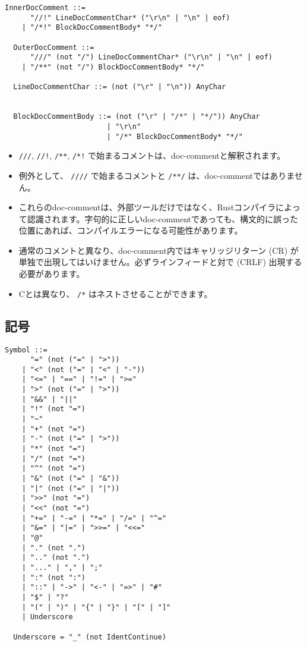 \documentclass[dvipdfmx,uplatex,papersize,a4paper,10pt]{jsbook}
\theoremstyle{definition}
\begin{document}
\begin{lstlisting}[gobble=2]
  InnerDocComment ::=
      "//!" LineDocCommentChar* ("\r\n" | "\n" | eof)
    | "/*!" BlockDocCommentBody* "*/"

  OuterDocComment ::=
      "///" (not "/") LineDocCommentChar* ("\r\n" | "\n" | eof)
    | "/**" (not "/") BlockDocCommentBody* "*/"

  LineDocCommentChar ::= (not ("\r" | "\n")) AnyChar


  BlockDocCommentBody ::= (not ("\r" | "/*" | "*/")) AnyChar
                        | "\r\n"
                        | "/*" BlockDocCommentBody* "*/"
\end{lstlisting}

\begin{itemize}
  \item \verb|///|, \verb|//!|, \verb|/**|, \verb|/*!| で始まるコメントは、doc-commentと解釈されます。
  \item 例外として、 \verb|////| で始まるコメントと \verb|/**/| は、doc-commentではありません。
  \item これらのdoc-commentは、外部ツールだけではなく、Rustコンパイラによって認識されます。字句的に正しいdoc-commentであっても、構文的に誤った位置にあれば、コンパイルエラーになる可能性があります。
  \item 通常のコメントと異なり、doc-comment内ではキャリッジリターン (CR) が単独で出現してはいけません。必ずラインフィードと対で (CRLF) 出現する必要があります。
  \item Cとは異なり、 \verb|/*| はネストさせることができます。
\end{itemize}

\subsection{記号}

\begin{lstlisting}[gobble=2]
  Symbol ::=
      "=" (not ("=" | ">"))
    | "<" (not ("=" | "<" | "-"))
    | "<=" | "==" | "!=" | ">="
    | ">" (not ("=" | ">"))
    | "&&" | "||"
    | "!" (not "=")
    | "~"
    | "+" (not "=")
    | "-" (not ("=" | ">"))
    | "*" (not "=")
    | "/" (not "=")
    | "^" (not "=")
    | "&" (not ("=" | "&"))
    | "|" (not ("=" | "|"))
    | ">>" (not "=")
    | "<<" (not "=")
    | "+=" | "-=" | "*=" | "/=" | "^="
    | "&=" | "|=" | ">>=" | "<<="
    | "@"
    | "." (not ".")
    | ".." (not ".")
    | "..." | "," | ";"
    | ":" (not ":")
    | "::" | "->" | "<-" | "=>" | "#"
    | "$" | "?"
    | "(" | ")" | "{" | "}" | "[" | "]"
    | Underscore

  Underscore = "_" (not IdentContinue)
\end{lstlisting}
\end{document}
